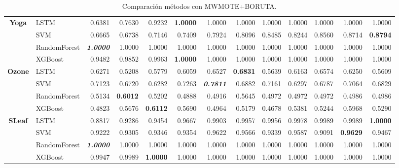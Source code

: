\begin{table}[H]
\begin{adjustbox}{max width=12cm}
\begin{tabular}{|c|l|r|r|r|r|r|r|r|r|r|r|r|}
			\hline
			\textbf{Yoga}         & LSTM         & 0.6381          & 0.7630 & 0.9232 & \textbf{1.0000} & 1.0000          & 1.0000          & 1.0000 & 1.0000 & 1.0000          & 1.0000 & 1.0000          \\
			                      & SVM          & 0.6665          & 0.6738 & 0.7146 & 0.7409          & 0.7924          & 0.8096          & 0.8485 & 0.8244 & 0.8560          & 0.8714 & \textbf{0.8794}          \\
			                      & RandomForest & \textit{\textbf{1.0000}} & 1.0000 & 1.0000 & 1.0000          & 1.0000          & 1.0000          & 1.0000 & 1.0000 & 1.0000          & 1.0000 & 1.0000          \\
			                      & XGBoost      & 0.9482          & 0.9852 & 0.9963 & \textbf{1.0000}          & 1.0000          & 1.0000          & 1.0000 & 1.0000 & 1.0000          & 1.0000 & 1.0000          \\
			\hline
			\textbf{Ozone}        & LSTM         & 0.6271          & 0.5208 & 0.5779 & 0.6059          & 0.6527          & \textbf{0.6831}          & 0.5639 & 0.6163 & 0.6574          & 0.6250 & 0.5609          \\
			                      & SVM          & 0.7123          & 0.6720 & 0.6282 & 0.7263          & \textit{\textbf{0.7811}} & 0.6882          & 0.7161 & 0.6297 & 0.6787          & 0.7064 & 0.6829          \\
			                      & RandomForest & 0.5134          & \textbf{0.6012} & 0.5202 & 0.4888          & 0.4916          & 0.5645          & 0.4972 & 0.4972 & 0.4972          & 0.4986 & 0.4986          \\
			                      & XGBoost      & 0.4823          & 0.5676 & \textbf{0.6112} & 0.5690          & 0.4964          & 0.5179          & 0.4678 & 0.5381 & 0.5244          & 0.5968 & 0.5290          \\
			\hline
			\textbf{SLeaf}        & LSTM         & 0.8817          & 0.9286 & 0.9454 & 0.9667          & 0.9903          & 0.9957          & 0.9956 & 0.9978 & 0.9989          & 0.9989 & \textbf{1.0000} \\
			                      & SVM          & 0.9222          & 0.9305 & 0.9346 & 0.9354          & 0.9622          & 0.9566          & 0.9339 & 0.9587 & 0.9091          & \textbf{0.9629} & 0.9467          \\
			                      & RandomForest & \textit{\textbf{1.0000}} & 1.0000 & 1.0000 & 1.0000          & 1.0000          & 1.0000          & 1.0000 & 1.0000 & 1.0000          & 1.0000 & 1.0000          \\
			                      & XGBoost      & 0.9947          & 0.9989 & \textbf{1.0000} & 1.0000          & 1.0000          & 1.0000          & 1.0000 & 1.0000 & 1.0000          & 1.0000 & 1.0000          \\
			\hline
		\end{tabular}
	\end{adjustbox}
	\caption{Comparación métodos con MWMOTE+BORUTA.}
	\label{tab:all_comp_mwmote_boruta}
\end{table}

